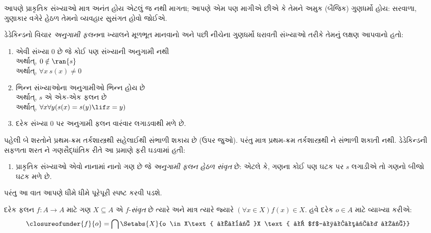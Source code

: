 \label{guunit:OLP-0051}


આપણે પ્રાકૃતિક સંખ્યાઓ માત્ર અનંત હોય એટલું જ નથી માગતા; આપણે એમ પણ
માગીએ છીએ કે તેમને અમુક (બૈજિક) ગુણધર્મો હોય: સરવાળા, ગુણાકાર વગેરે
હેઠળ તેમનો વ્યવહાર સુસંગત હોવો જોઈએ.

ડેડેકિન્ડનો વિચાર \emph{અનુગામી ફલન}ના ખ્યાલને મૂળભૂત માનવાનો અને
પછી નીચેના ગુણધર્મો ધરાવતી સંખ્યાઓ તરીકે તેમનું લક્ષણ આપવાનો હતો:
\begin{enumerate}
	\item એવી સંખ્યા $0$ છે જે કોઈ પણ સંખ્યાની અનુગામી નથી
	\\અર્થાત્, $0 \notin \ran{s}$
	\\અર્થાત્, $\forall x\ s(x) \neq 0$
	\item ભિન્ન સંખ્યાઓના અનુગામીઓ ભિન્ન હોય છે
	\\અર્થાત્, $s$ એ એક-એક ફલન છે
	\\અર્થાત્, $\forall x \forall y (s(x) = s(y) \lif x = y)$
	\item{} દરેક સંખ્યા $0$ પર અનુગામી
	ફલન વારંવાર લગાડવાથી મળે છે.
\end{enumerate}
પહેલી બે શરતોને પ્રથમ-ક્રમ તર્કશાસ્ત્રથી સહેલાઈથી સંભાળી શકાય છે
(ઉપર જુઓ). પરંતુ માત્ર પ્રથમ-ક્રમ તર્કશાસ્ત્રથી
ને સંભાળી શકાતી નથી. ડેડેકિન્ડની સફળતા
શરત ને ગણસૈદ્ધાંતિક રીતે આ પ્રમાણે ફરી
ઘડવામાં હતી:
\begin{enumerate}
	\item[3$'$.] પ્રાકૃતિક સંખ્યાઓ એવો નાનામાં નાનો ગણ છે જે
	\emph{અનુગામી ફલન હેઠળ સંવૃત} છે: એટલે કે, ગણના કોઈ પણ
	ઘટક પર $s$ લગાડીએ તો ગણનો બીજો ઘટક મળે છે.
\end{enumerate}
પરંતુ આ વાત આપણે ધીમે ધીમે પૂરેપૂરી સ્પષ્ટ કરવી પડશે.

\begin{defn}
	દરેક ફલન $f \colon A \to A$ માટે ગણ $X \subseteq A$ એ
	$f$-\emph{સંવૃત} છે ત્યારે અને માત્ર ત્યારે જ્યારે $(\forall x \in X)f(x) \in X$.
	હવે દરેક $o \in A$ માટે વ્યાખ્યા કરીએ:
	$$\closureofunder{f}{o} = \bigcap\Setabs{X}{o \in X\text{ અને }X
\text{ એ $f$-સંવૃત છે}}$$
\end{defn}

